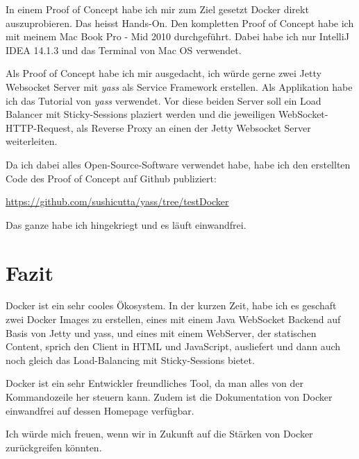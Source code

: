 In einem Proof of Concept habe ich mir zum Ziel gesetzt Docker direkt auszuprobieren. Das heisst
Hands-On. Den kompletten Proof of Concept habe ich mit meinem Mac Book Pro - Mid 2010 durchgeführt.
Dabei habe ich nur IntelliJ IDEA 14.1.3 und das Terminal von Mac OS verwendet.

Als Proof of Concept habe ich mir ausgedacht, ich würde gerne zwei Jetty Websocket Server
mit \textit{yass} als Service Framework erstellen. Als Applikation habe ich das Tutorial
von \textit{yass} verwendet. Vor diese beiden Server soll ein Load Balancer mit
Sticky-Sessions plaziert werden und die jeweiligen WebSocket-HTTP-Request, als Reverse Proxy
an einen der Jetty Websocket Server weiterleiten.

Da ich dabei alles Open-Source-Software verwendet habe, habe ich den erstellten Code des Proof
of Concept auf Github publiziert:

\url{https://github.com/sushicutta/yass/tree/testDocker}

Das ganze habe ich hingekriegt und es läuft einwandfrei.
\\

\section{Fazit}

Docker ist ein sehr cooles Ökosystem. In der kurzen Zeit, habe ich es geschaft zwei Docker Images
zu erstellen, eines mit einem Java WebSocket Backend auf Basis von Jetty und yass, und eines
mit einem WebServer, der statischen Content, sprich den Client in HTML und JavaScript, ausliefert
und dann auch noch gleich das Load-Balancing mit Sticky-Sessions bietet.

Docker ist ein sehr Entwickler freundliches Tool, da man alles von der Kommandozeile her steuern
kann. Zudem ist die Dokumentation von Docker einwandfrei auf dessen Homepage verfügbar.

Ich würde mich freuen, wenn wir in Zukunft auf die Stärken von Docker zurückgreifen könnten.